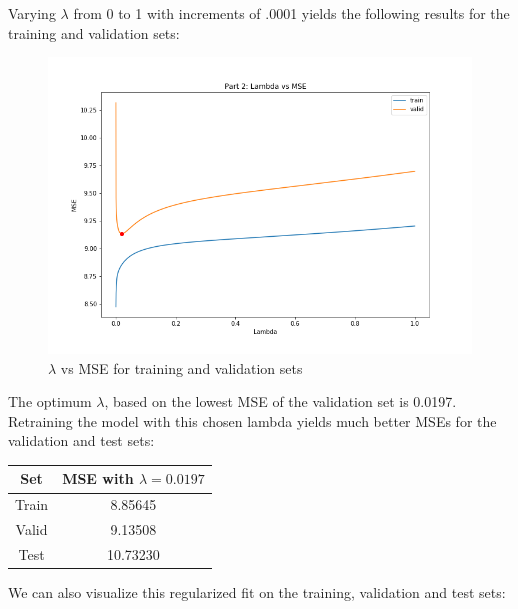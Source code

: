 \documentclass[paper=a4, fontsize=11pt]{scrartcl} %
\numberwithin{equation}{section} %
\numberwithin{figure}{section} %
\numberwithin{table}{section} %
\begin{document}
Varying \(\lambda\) from 0 to 1 with increments of .0001 yields the following results for the training and validation sets:

\begin{figure}[H]
    \includegraphics[width=\linewidth]{q1p14.png}
    \caption{\(\lambda\) vs MSE for training and validation sets}
    \label{fig:q1p14}
\end{figure}

The optimum \(\lambda\), based on the lowest MSE of the validation set is 0.0197. Retraining the model with this chosen lambda yields much better MSEs for the validation and test sets:

\begin{center}
\begin{tabular}{ |c|c| } 
    \hline
    \textbf{Set} & \textbf{MSE with \(\lambda = 0.0197\)} \\ 
    \hline
    Train & 8.85645 \\
    Valid & 9.13508 \\ 
    Test & 10.73230 \\
    \hline
\end{tabular}
\end{center}

We can also visualize this regularized fit on the training, validation and test sets:
\end{document}
